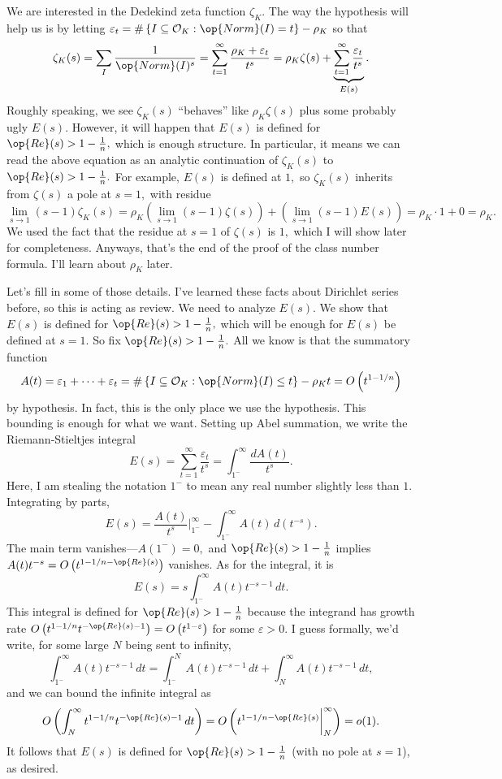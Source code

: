 We are interested in the Dedekind zeta function $\zeta_K.$ The way the hypothesis will help us is by letting $\varepsilon_t=\#\left\{I\subseteq\mathcal O_K:\op{Norm}(I)=t\right\}-\rho_K$ so that
\[\zeta_K(s)=\sum_I\frac1{\op{Norm}(I)^s}=\sum_{t=1}^\infty\frac{\rho_K+\varepsilon_t}{t^s}=\rho_K\zeta(s)+\underbrace{\sum_{t=1}^\infty\frac{\varepsilon_t}{t^s}}_{E(s)}.\]
Roughly speaking, we see $\zeta_K(s)$ ``behaves'' like $\rho_K\zeta(s)$ plus some probably ugly $E(s).$ However, it will happen that $E(s)$ is defined for $\op{Re}(s)>1-\frac1n,$ which is enough structure. In particular, it means we can read the above equation as an analytic continuation of $\zeta_K(s)$ to $\op{Re}(s)>1-\frac1n.$ For example, $E(s)$ is defined at $1,$ so $\zeta_K(s)$ inherits from $\zeta(s)$ a pole at $s=1,$ with residue
\[\lim_{s\to1}(s-1)\zeta_K(s)=\rho_K\left(\lim_{s\to1}(s-1)\zeta(s)\right)+\left(\lim_{s\to1}(s-1)E(s)\right)=\rho_K\cdot1+0=\rho_K.\]
We used the fact that the residue at $s=1$ of $\zeta(s)$ is $1,$ which I will show later for completeness. Anyways, that's the end of the proof of the class number formula. I'll learn about $\rho_K$ later.

Let's fill in some of those details. I've learned these facts about Dirichlet series before, so this is acting as review. We need to analyze $E(s).$ We show that $E(s)$ is defined for $\op{Re}(s)>1-\frac1n,$ which will be enough for $E(s)$ be defined at $s=1.$ So fix $\op{Re}(s)>1-\frac1n.$ All we know is that the summatory function 
\[A(t)=\varepsilon_1+\cdots+\varepsilon_t=\#\left\{I\subseteq\mathcal O_K:\op{Norm}(I)\le t\right\}-\rho_Kt=O\left(t^{1-1/n}\right)\]
by hypothesis. In fact, this is the only place we use the hypothesis. This bounding is enough for what we want. Setting up Abel summation, we write the Riemann-Stieltjes integral
\[E(s)=\sum_{t=1}^\infty\frac{\varepsilon_t}{t^s}=\int_{1^-}^\infty\frac{dA(t)}{t^s}.\]
Here, I am stealing the notation $1^-$ to mean any real number slightly less than $1.$ Integrating by parts,
\[E(s)=\frac{A(t)}{t^s}\bigg|_{1^-}^\infty-\int_{1^-}^\infty A(t)\,d\left(t^{-s}\right).\]
The main term vanishes---$A\left(1^-\right)=0,$ and $\op{Re}(s)>1-\frac1n$ implies $A(t)t^{-s}=O\left(t^{1-1/n-\op{Re}(s)}\right)$ vanishes. As for the integral, it is
\[E(s)=s\int_{1^-}^\infty A(t)t^{-s-1}\,dt.\]
This integral is defined for $\op{Re}(s)>1-\frac1n$ because the integrand has growth rate $O\left(t^{1-1/n}t^{-\op{Re}(s)-1}\right)=O\left(t^{1-\varepsilon}\right)$ for some $\varepsilon>0.$ I guess formally, we'd write, for some large $N$ being sent to infinity,
\[\int_{1^-}^\infty A(t)t^{-s-1}\,dt=\int_{1^-}^NA(t)t^{-s-1}\,dt+\int_N^\infty A(t)t^{-s-1}\,dt,\]
and we can bound the infinite integral as
\[O\left(\int_N^\infty t^{1-1/n}t^{-\op{Re}(s)-1}\,dt\right)=O\left(t^{1-1/n-\op{Re}(s)}\bigg|_N^\infty\right)=o(1).\]
It follows that $E(s)$ is defined for $\op{Re}(s)>1-\frac1n$ (with no pole at $s=1$), as desired.

